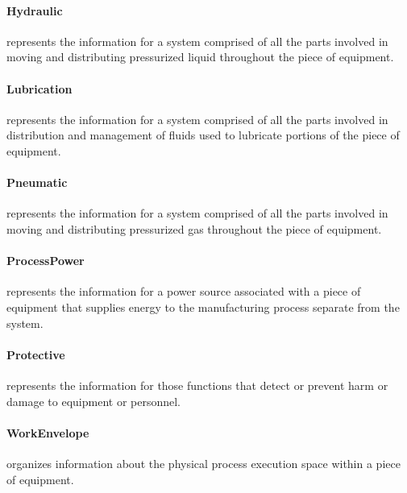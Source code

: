 \paragraph{Hydraulic}\mbox{}
\label{sec:Hydraulic}



 represents the information for a system comprised of all the parts involved in moving and distributing pressurized liquid throughout the piece of equipment.


\paragraph{Lubrication}\mbox{}
\label{sec:Lubrication}



 represents the information for a system comprised of all the parts involved in distribution and management of fluids used to lubricate portions of the piece of equipment.


\paragraph{Pneumatic}\mbox{}
\label{sec:Pneumatic}



 represents the information for a system comprised of all the parts involved in moving and distributing pressurized gas throughout the piece of equipment.


\paragraph{ProcessPower}\mbox{}
\label{sec:ProcessPower}



 represents the information for a power source associated with a piece of equipment that supplies energy to the manufacturing process separate from the  system.


\paragraph{Protective}\mbox{}
\label{sec:Protective}



 represents the information for those functions that detect or prevent harm or damage to equipment or personnel.


\paragraph{WorkEnvelope}\mbox{}
\label{sec:WorkEnvelope}



 organizes information about the physical process execution space within a piece of equipment.

